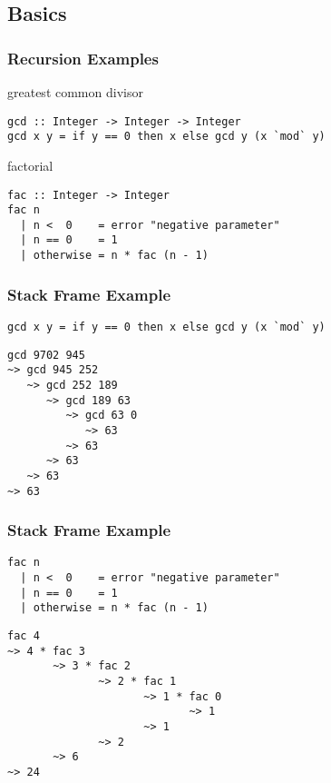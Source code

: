 \documentclass[dvipsnames]{beamer}
\theoremstyle{plain}
\begin{document}
\subsection{Basics}

\begin{frame}[fragile]
  \frametitle{Recursion Examples}

  \begin{exampleblock}{greatest common divisor}
    \begin{lstlisting}
gcd :: Integer -> Integer -> Integer
gcd x y = if y == 0 then x else gcd y (x `mod` y)
    \end{lstlisting}
  \end{exampleblock}

  \pause
  \begin{exampleblock}{factorial}
    \begin{lstlisting}
fac :: Integer -> Integer
fac n
  | n <  0    = error "negative parameter"
  | n == 0    = 1
  | otherwise = n * fac (n - 1)
    \end{lstlisting}
  \end{exampleblock}
\end{frame}

\begin{frame}[fragile]
  \frametitle{Stack Frame Example}

  \begin{exampleblock}{}
    \begin{lstlisting}
gcd x y = if y == 0 then x else gcd y (x `mod` y)
    \end{lstlisting}

    \begin{lstlisting}[frame=single]
gcd 9702 945
~> gcd 945 252
   ~> gcd 252 189
      ~> gcd 189 63
         ~> gcd 63 0
            ~> 63
         ~> 63
      ~> 63
   ~> 63
~> 63
    \end{lstlisting}
  \end{exampleblock}
\end{frame}

\begin{frame}[fragile]
  \frametitle{Stack Frame Example}

  \begin{exampleblock}{}
    \begin{lstlisting}
fac n
  | n <  0    = error "negative parameter"
  | n == 0    = 1
  | otherwise = n * fac (n - 1)
    \end{lstlisting}

    \begin{lstlisting}[frame=single]
fac 4
~> 4 * fac 3
       ~> 3 * fac 2
              ~> 2 * fac 1
                     ~> 1 * fac 0
                            ~> 1
                     ~> 1
              ~> 2
       ~> 6
~> 24
    \end{lstlisting}
  \end{exampleblock}
\end{frame}
\end{document}
